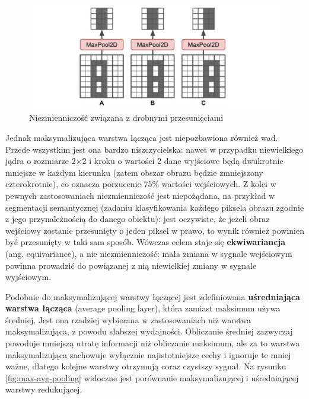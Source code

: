 \documentclass[12pt]{mwbk}
\theoremstyle{plain}
\theoremstyle{definition}
\theoremstyle{remark}
\newcommand\zrodlo[1]{\par\vspace{-3mm}{\small\textit{Źródło: }#1 }}
\begin{document}
\begin{figure}[!h]
	\centering
	\includegraphics[width=\linewidth]{rys/niezmienniczosc_pooling.png}
	\caption{Niezmienniczość związana z drobnymi przesunięciami}
	\zrodlo{\cite{geron}}
	\label{fig:niezmienniczosc-pooling}
\end{figure}



Jednak maksymalizująca warstwa łącząca jest niepozbawiona również wad. Przede wszystkim jest
ona bardzo niszczycielska: nawet w przypadku niewielkiego jądra o rozmiarze 2×2 i kroku o wartości 2
dane wyjściowe będą dwukrotnie mniejsze w każdym kierunku (zatem obszar obrazu będzie
zmniejszony czterokrotnie), co oznacza porzucenie 75\% wartości wejściowych. Z kolei w pewnych
zastosowaniach niezmienniczość jest niepożądana, na przykład w segmentacji semantycznej (zadaniu
klasyfikowania każdego piksela obrazu zgodnie z jego przynależnością do danego obiektu): jest oczywiste, że jeżeli obraz wejściowy zostanie przesunięty o jeden piksel w prawo, to wynik również powinien być przesunięty w taki sam sposób. Wówczas celem staje się \textbf{ekwiwariancja} (ang. equivariance), a nie niezmienniczość: mała zmiana w sygnale wejściowym
powinna prowadzić do powiązanej z nią niewielkiej zmiany w sygnale wyjściowym.

Podobnie do maksymalizującej warstwy łączącej jest zdefiniowana \textbf{uśredniająca warstwa łącząca} (average pooling layer), która zamiast maksimum używa średniej. Jest ona rzadziej wybierana w zastosowaniach niż warstwa maksymalizująca, z powodu słabszej wydajności. Obliczanie średniej zazwyczaj powoduje mniejszą utratę informacji niż obliczanie maksimum, ale za to warstwa maksymalizująca zachowuje wyłącznie najistotniejsze cechy i ignoruje te mniej ważne, dlatego kolejne warstwy otrzymują coraz czystszy sygnał. Na rysunku \ref{fig:max-avg-pooling} widoczne jest porównanie maksymalizującej i uśredniającej warstwy redukującej.
\end{document}
